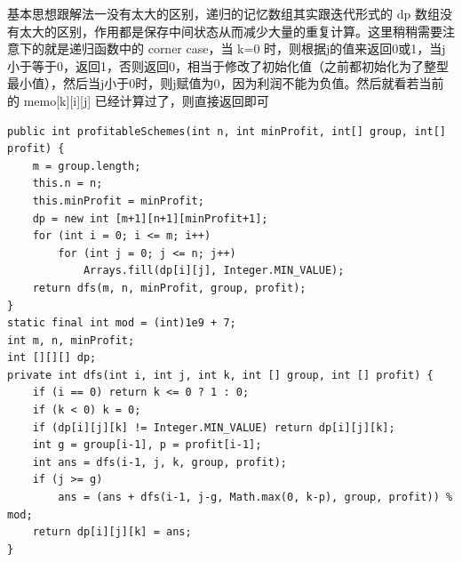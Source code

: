 \documentclass[9pt, b5paaper]{book}
\begin{document}
\begin{enumerate}
基本思想跟解法一没有太大的区别，递归的记忆数组其实跟迭代形式的 dp 数组没有太大的区别，作用都是保存中间状态从而减少大量的重复计算。这里稍稍需要注意下的就是递归函数中的 corner case，当 k=0 时，则根据j的值来返回0或1，当j小于等于0，返回1，否则返回0，相当于修改了初始化值（之前都初始化为了整型最小值），然后当j小于0时，则j赋值为0，因为利润不能为负值。然后就看若当前的 memo[k][i][j] 已经计算过了，则直接返回即可
\begin{verbatim}
public int profitableSchemes(int n, int minProfit, int[] group, int[] profit) {
    m = group.length;
    this.n = n;
    this.minProfit = minProfit;
    dp = new int [m+1][n+1][minProfit+1];
    for (int i = 0; i <= m; i++) 
        for (int j = 0; j <= n; j++) 
            Arrays.fill(dp[i][j], Integer.MIN_VALUE);
    return dfs(m, n, minProfit, group, profit);
}
static final int mod = (int)1e9 + 7;
int m, n, minProfit;
int [][][] dp;
private int dfs(int i, int j, int k, int [] group, int [] profit) {
    if (i == 0) return k <= 0 ? 1 : 0;
    if (k < 0) k = 0;
    if (dp[i][j][k] != Integer.MIN_VALUE) return dp[i][j][k];
    int g = group[i-1], p = profit[i-1];
    int ans = dfs(i-1, j, k, group, profit);
    if (j >= g)
        ans = (ans + dfs(i-1, j-g, Math.max(0, k-p), group, profit)) % mod;
    return dp[i][j][k] = ans;
}
\end{verbatim}
\end{enumerate}
\end{document}
